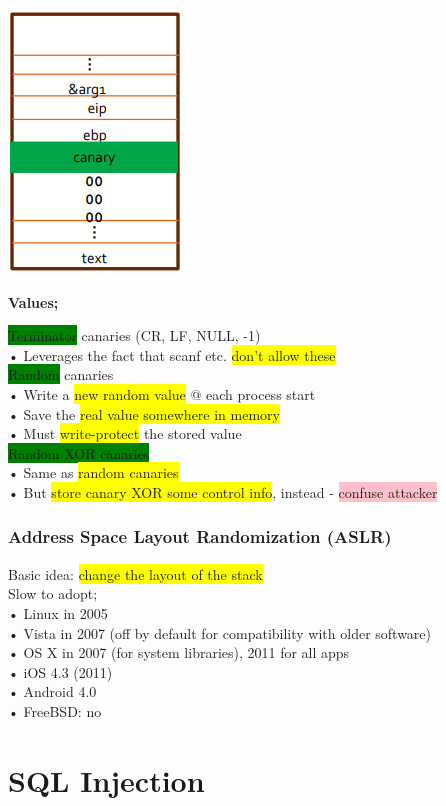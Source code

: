 \documentclass[]{project_plan}
\begin{document}
\includegraphics[width=.3\linewidth]{canary.png}

\textbf{Values;}

\colorbox{green}{Terminator} canaries (CR, LF, NULL, -1)\\
• Leverages the fact that scanf etc. \colorbox{yellow}{don’t allow these}\\
\colorbox{green}{Random} canaries\\
• Write a \colorbox{yellow}{new random value} @ each process start\\
• Save the \colorbox{yellow}{real value somewhere in memory}\\
• Must \colorbox{yellow}{write-protect} the stored value\\
\colorbox{green}{Random XOR canaries}\\
• Same as \colorbox{yellow}{random canaries}\\
• But \colorbox{yellow}{store canary XOR some control info}, instead - \colorbox{pink}{confuse attacker}

\subsubsection{Address Space Layout Randomization (ASLR)}

Basic idea: \colorbox{yellow}{change the layout of the stack}\\
Slow to adopt;\\
• Linux in 2005\\
• Vista in 2007 (off by default for compatibility with older software)\\
• OS X in 2007 (for system libraries), 2011 for all apps\\
• iOS 4.3 (2011)\\
• Android 4.0\\
• FreeBSD: no


\section{SQL Injection}
\end{document}
